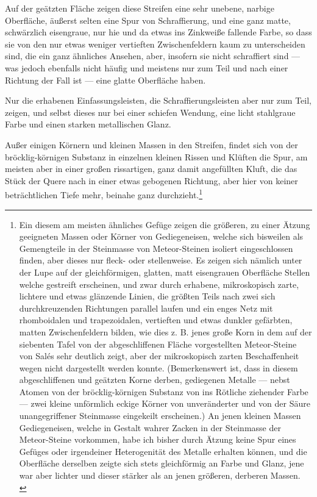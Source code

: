\documentclass[a4paper, 11pt, oneside, german]{article}
\begin{document}
Auf der geätzten Fläche zeigen diese Streifen eine sehr unebene, narbige Oberfläche, äußerst selten eine Spur von Schraffierung, und eine ganz matte, schwärzlich eisengraue, nur hie und da etwas ins Zinkweiße fallende Farbe, so dass sie von den nur etwas weniger vertieften Zwischenfeldern kaum zu unterscheiden sind, die ein ganz ähnliches Ansehen, aber, insofern sie nicht schraffiert sind --- was jedoch ebenfalls nicht häufig und meistens nur zum Teil und nach einer Richtung der Fall ist --- eine glatte Oberfläche haben.

Nur die erhabenen Einfassungsleisten, die Schraffierungsleisten aber nur zum Teil, zeigen, und selbst dieses nur bei einer schiefen Wendung, eine licht stahlgraue Farbe und einen starken metallischen Glanz.

Außer einigen Körnern und kleinen Massen in den Streifen, findet sich von der bröcklig-körnigen Substanz in einzelnen kleinen Rissen und Klüften die Spur, am meisten aber in einer großen rissartigen, ganz damit angefüllten Kluft, die das Stück der Quere nach in einer etwas gebogenen Richtung, aber hier von keiner beträchtlichen Tiefe mehr, beinahe ganz durchzieht.\footnote{Ein diesem am meisten ähnliches Gefüge zeigen die größeren, zu einer Ätzung geeigneten Massen oder Körner von Gediegeneisen, welche sich bisweilen als Gemengteile in der Steinmasse von Meteor-Steinen isoliert eingeschlossen finden, aber dieses nur fleck- oder stellenweise. Es zeigen sich nämlich unter der Lupe auf der gleichförmigen, glatten, matt eisengrauen Oberfläche Stellen welche gestreift erscheinen, und zwar durch erhabene, mikroskopisch zarte, lichtere und etwas glänzende Linien, die größten Teils nach zwei sich durchkreuzenden Richtungen parallel laufen und ein enges Netz mit rhomboidalen und trapezoidalen, vertieften und etwas dunkler gefärbten, matten Zwischenfeldern bilden, wie dies z. B. jenes große Korn in dem auf der siebenten Tafel von der abgeschliffenen Fläche vorgestellten Meteor-Steine von Salés sehr deutlich zeigt, aber der mikroskopisch zarten Beschaffenheit wegen nicht dargestellt werden konnte. (Bemerkenswert ist, dass in diesem abgeschliffenen und geätzten Korne derben, gediegenen Metalle --- nebst Atomen von der bröcklig-körnigen Substanz von ins Rötliche ziehender Farbe --- zwei kleine unförmlich eckige Körner von unveränderter und von der Säure unangegriffener Steinmasse eingekeilt erscheinen.) An jenen kleinen Massen Gediegeneisen, welche in Gestalt wahrer Zacken in der Steinmasse der Meteor-Steine vorkommen, habe ich bisher durch Ätzung keine Spur eines Gefüges oder irgendeiner Heterogenität des Metalle erhalten können, und die Oberfläche derselben zeigte sich stets gleichförmig an Farbe und Glanz, jene war aber lichter und dieser stärker als an jenen größeren, derberen Massen.\\
}
\end{document}
